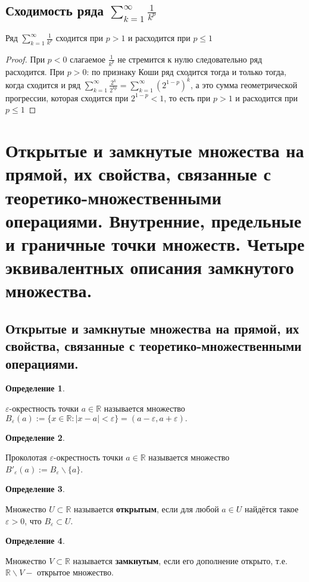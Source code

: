 \documentclass[12pt]{article}
\theoremstyle{definition}
\begin{document}
\subsection{Сходимость ряда $\displaystyle\sum_{k = 1}^{\infty}\frac{1}{k^p}$}
Ряд $\displaystyle\sum_{k = 1}^{\infty}\frac{1}{k^p}$ сходится при $p > 1$ и расходится при $p \leq 1$
\begin{proof}
При $p < 0$ слагаемое $\frac{1}{k^p}$ не стремится к нулю следовательно ряд расходится.
При $p > 0$: по признаку Коши ряд сходится тогда и только тогда, когда сходится и ряд $\displaystyle\sum_{k = 1}^{\infty}\frac{2^k}{2^{kp}} = \displaystyle\sum_{k = 1}^{\infty}(2^{1-p})^k$, а это сумма геометрической прогрессии, которая сходится при $2^{1-p} < 1$, то есть при $p > 1$ и расходится при $p \leq 1$
\end{proof}

\section{Открытые и замкнутые множества на прямой, их свойства, связанные с теоретико-множественными операциями. Внутренние, предельные и граничные точки множеств. Четыре эквивалентных описания замкнутого множества.}

\subsection{Открытые и замкнутые множества на прямой, их свойства, связанные с теоретико-множественными операциями.}

\textbf{Определение 1}.

$\varepsilon$-окрестность точки $a \in\mathbb{R}$ называется множество $B_\varepsilon(a) := \{x\in\mathbb{R}: |x-a| < \varepsilon\} = (a-\varepsilon, a +\varepsilon).$

\textbf{Определение 2}.

Проколотая $\varepsilon$-окрестность точки $a \in\mathbb{R}$ называется множество $B'_\varepsilon(a) := B_\varepsilon \backslash \{a\}$.

\textbf{Определение 3}.

Множество $U\subset\mathbb{R}$ называется \textbf{открытым}, если для любой $a\in U$ найдётся такое $\varepsilon > 0$, что $B_\varepsilon \subset U$.

\textbf{Определение 4}.

Множество $V \subset\mathbb{R}$ называется \textbf{замкнутым}, если его дополнение открыто, т.е. $\mathbb{R} \backslash V - $ открытое множество.
\end{document}
